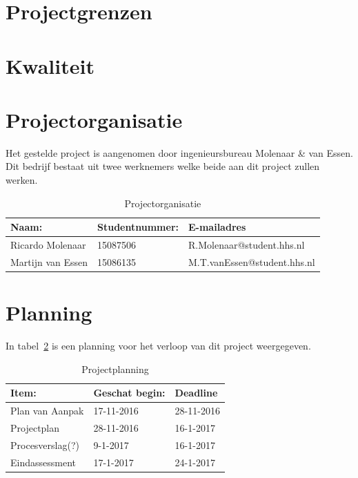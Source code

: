 \documentclass[numbers=endperiod]{scrartcl}
\begin{document}
	\section{Projectgrenzen}
	\newpage

	\section{Kwaliteit}
	\newpage

	\section{Projectorganisatie}
	Het gestelde project is aangenomen door ingenieursbureau Molenaar \& van Essen. Dit bedrijf bestaat uit
	twee werknemers welke beide aan dit project zullen werken. 
	\begin{table}[h]
	\caption{Projectorganisatie}\label{table:Projectorganisatie}
	
		\centering
		\begin{tabular}{ p{} | p{} | p{} }
			Naam: 				& Studentnummer:& E-mailadres \\ \hline
			Ricardo Molenaar 	& 15087506	 	& R.Molenaar@student.hhs.nl \\
			Martijn van Essen 	& 15086135		& M.T.vanEssen@student.hhs.nl \\
		\end{tabular}
	
	\end{table}
		\newpage

	\section{Planning}
	In tabel~\ref{table:Planning} is een planning voor het verloop van dit project weergegeven.
	\begin{table}[h]
	\caption{Projectplanning}\label{table:Planning}
	\centering
	\begin{tabular}{| p{} | p{} | p{} |}
			\hline \rowcolor{hhs_theme_heading_2}
			Item: 				& Geschat begin:& Deadline \\ \hline
			Plan van Aanpak 	& 17-11-2016 	& 28-11-2016 \\ \hline
			Projectplan		 	& 28-11-2016	& 16-1-2017 \\ \hline
			Procesverslag(?)	& 9-1-2017		& 16-1-2017 \\ \hline
			Eindassessment		& 17-1-2017		& 24-1-2017 \\ \hline
		\end{tabular}
	\end{table}
	
	\newpage


	
	
\end{document}
